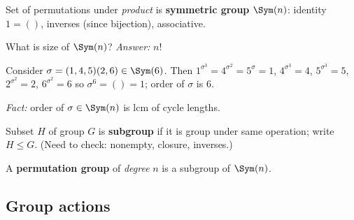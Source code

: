 \begin{slide}
    Set of permutations under \textit{product} is \textbf{symmetric group} $\Sym(n)$: identity $1 = ()$, inverses (since bijection), associative.

    What is size of $\Sym(n)$? \pause \textit{Answer:} $n!$

    \begin{example}
        \vspace{0pt}
        Consider $\sigma = (1,4,5)(2,6) \in \Sym(6)$. Then $1^{\sigma^3} = 4^{\sigma^2} = 5^\sigma = 1$, \pause $4^{\sigma^3} = 4$, $5^{\sigma^3} = 5$, $2^{\sigma^2} = 2$, $6^{\sigma^2} = 6$ so \pause $\sigma^6 = () = 1$; order of $\sigma$ is 6. \pause

        \textit{Fact:} order of $\sigma \in \Sym(n)$ is lcm of cycle lengths.
    \end{example} \pause

    \begin{definition}[subgroup]
        \vspace{0pt}
        Subset $H$ of group $G$ is \textbf{subgroup} if it is group under same operation; write $H \leq G$. (Need to check: nonempty, closure, inverses.)
    \end{definition} \pause

    \begin{definition}
        \vspace{0pt}
        A \textbf{permutation group} of \textit{degree} $n$ is a subgroup of $\Sym(n)$.
    \end{definition}
\end{slide}

\subsection{Group actions}

